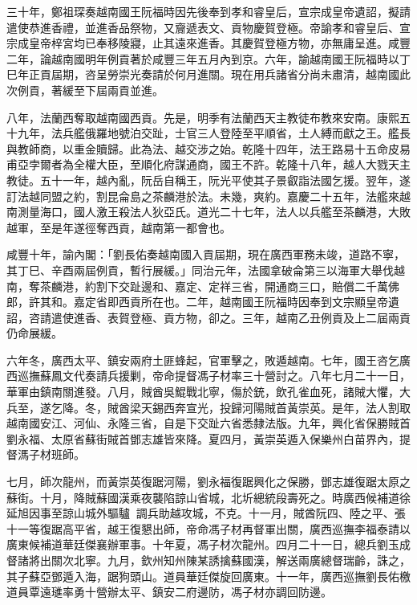 \begin{pinyinscope}
三十年，鄭祖琛奏越南國王阮福時因先後奉到孝和睿皇后，宣宗成皇帝遺詔，擬請遣使恭進香禮，並進香品祭物，又齎遞表文、貢物慶賀登極。帝諭孝和睿皇后、宣宗成皇帝梓宮均已奉移陵寢，止其遠來進香。其慶賀登極方物，亦無庸呈進。咸豐二年，論越南國明年例貢著於咸豐三年五月內到京。六年，諭越南國王阮福時以丁巳年正貢屆期，咨呈勞崇光奏請於何月進關。現在用兵諸省分尚未肅清，越南國此次例貢，著緩至下屆兩貢並進。

八年，法蘭西奪取越南國西貢。先是，明季有法蘭西天主教徒布教來安南。康熙五十九年，法兵艦俄羅地號泊交趾，士官三人登陸至平順省，土人縛而獻之王。艦長與教師商，以重金贖歸。此為法、越交涉之始。乾隆十四年，法王路易十五命皮易甫亞孛爾者為全權大臣，至順化府謀通商，國王不許。乾隆十八年，越人大戮天主教徒。五十一年，越內亂，阮岳自稱王，阮光平使其子景叡詣法國乞援。翌年，遂訂法越同盟之約，割昆侖島之茶麟港於法。未幾，爽約。嘉慶二十五年，法艦來越南測量海口，國人激王殺法人狄亞氏。道光二十七年，法人以兵艦至茶麟港，大敗越軍，至是年遂徑奪西貢，越南第一都會也。

咸豐十年，諭內閣：「劉長佑奏越南國入貢屆期，現在廣西軍務未竣，道路不寧，其丁巳、辛酉兩屆例貢，暫行展緩。」同治元年，法國拿破侖第三以海軍大舉伐越南，奪茶麟港，約割下交趾邊和、嘉定、定祥三省，開通商三口，賠償二千萬佛郎，許其和。嘉定省即西貢所在也。二年，越南國王阮福時因奉到文宗顯皇帝遺詔，咨請遣使進香、表賀登極、貢方物，卻之。三年，越南乙丑例貢及上二屆兩貢仍命展緩。

六年冬，廣西太平、鎮安兩府土匪蜂起，官軍擊之，敗遁越南。七年，國王咨乞廣西巡撫蘇鳳文代奏請兵援剿，帝命提督馮子材率三十營討之。八年七月二十一日，華軍由鎮南關進發。八月，賊酋吳鯤戰北寧，傷於銃，飲孔雀血死，諸賊大懼，大兵至，遂乞降。冬，賊酋梁天錫西奔宣光，投歸河陽賊首黃崇英。是年，法人割取越南國安江、河仙、永隆三省，自是下交趾六省悉隸法版。九年，興化省保勝賊首劉永福、太原省蘇街賊首鄧志雄皆來降。夏四月，黃崇英遁入保樂州白苗界內，提督溤子材班師。

七月，師次龍州，而黃崇英復踞河陽，劉永福復踞興化之保勝，鄧志雄復踞太原之蘇街。十月，降賊蘇國漢乘夜襲陷諒山省城，北圻總統段壽死之。時廣西候補道徐延旭因事至諒山城外驅驢，調兵助越攻城，不克。十一月，賊酋阮四、陸之平、張十一等復踞高平省，越王復懇出師，帝命馮子材再督軍出關，廣西巡撫李福泰請以廣東候補道華廷傑襄辦軍事。十年夏，馮子材次龍州。四月二十一日，總兵劉玉成督諸將出關次北寧。九月，欽州知州陳某誘擒蘇國漢，解送兩廣總督瑞齡，誅之，其子蘇亞鄧遁入海，踞狗頭山。道員華廷傑旋回廣東。十一年，廣西巡撫劉長佑檄道員覃遠璡率勇十營辦太平、鎮安二府邊防，馮子材亦調回防邊。


\end{pinyinscope}
